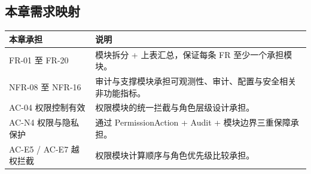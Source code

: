 \subsection{本章需求映射}
\noindent\begin{tabularx}{\textwidth}{L{3cm}Y}
  \toprule
  本章承担 & 说明 \\
  \midrule
  FR-01 至 FR-20 & 模块拆分 + 上表汇总，保证每条 FR 至少一个承担模块。 \\
  NFR-08 至 NFR-16 & 审计与支撑模块承担可观测性、审计、配置与安全相关非功能指标。 \\
  AC-04 权限控制有效 & 权限模块的统一拦截与角色层级设计承担。 \\
  AC-N4 权限与隐私保护 & 通过 PermissionAction + Audit + 模块边界三重保障承担。 \\
  AC-E5 / AC-E7 越权拦截 & 权限模块计算顺序与角色优先级比较承担。 \\
  \bottomrule
\end{tabularx}
